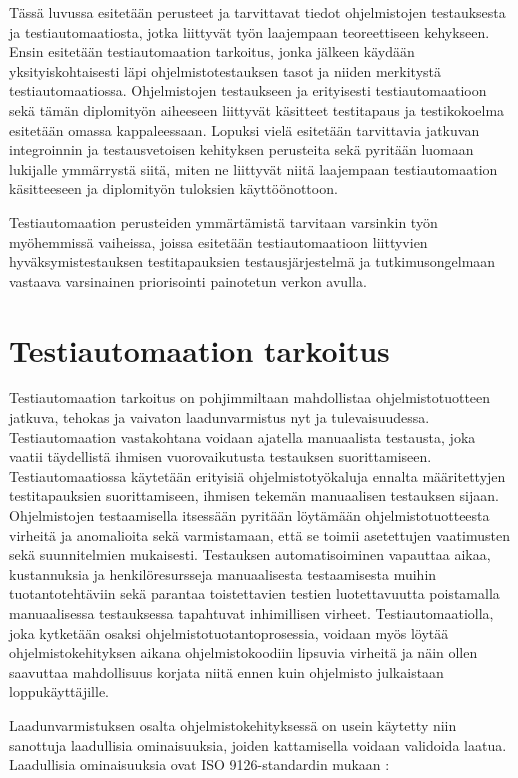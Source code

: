 Tässä luvussa esitetään perusteet ja tarvittavat tiedot ohjelmistojen testauksesta ja testiautomaatiosta, jotka liittyvät työn laajempaan teoreettiseen kehykseen.
Ensin esitetään testiautomaation tarkoitus, jonka jälkeen käydään yksityiskohtaisesti läpi ohjelmistotestauksen tasot ja niiden merkitystä testiautomaatiossa.
Ohjelmistojen testaukseen ja erityisesti testiautomaatioon sekä tämän diplomityön aiheeseen liittyvät käsitteet testitapaus ja testikokoelma esitetään omassa kappaleessaan.
Lopuksi vielä esitetään tarvittavia jatkuvan integroinnin ja testausvetoisen kehityksen perusteita sekä pyritään luomaan lukijalle ymmärrystä siitä, miten ne liittyvät niitä laajempaan testiautomaation käsitteeseen ja diplomityön tuloksien käyttöönottoon.

Testiautomaation perusteiden ymmärtämistä tarvitaan varsinkin työn myöhemmissä vaiheissa, joissa esitetään testiautomaatioon liittyvien hyväksymistestauksen testitapauksien testausjärjestelmä ja tutkimusongelmaan vastaava varsinainen priorisointi painotetun verkon avulla.

\section{Testiautomaation tarkoitus} \label{ch:07_testiautomaation_tarkoitus}

  Testiautomaation tarkoitus on pohjimmiltaan mahdollistaa ohjelmistotuotteen jatkuva, tehokas ja vaivaton laadunvarmistus nyt ja tulevaisuudessa.
  Testiautomaation vastakohtana voidaan ajatella manuaalista testausta, joka vaatii täydellistä ihmisen vuorovaikutusta testauksen suorittamiseen.
  Testiautomaatiossa käytetään erityisiä ohjelmistotyökaluja ennalta määritettyjen testitapauksien suorittamiseen, ihmisen tekemän manuaalisen testauksen sijaan.
  Ohjelmistojen testaamisella itsessään pyritään löytämään ohjelmistotuotteesta virheitä ja anomalioita sekä varmistamaan, että se toimii asetettujen vaatimusten sekä suunnitelmien mukaisesti.
  Testauksen automatisoiminen vapauttaa aikaa, kustannuksia ja henkilöresursseja manuaalisesta testaamisesta muihin tuotantotehtäviin sekä parantaa toistettavien testien luotettavuutta poistamalla manuaalisessa testauksessa tapahtuvat inhimillisen virheet.
  Testiautomaatiolla, joka kytketään osaksi ohjelmistotuotantoprosessia, voidaan myös löytää ohjelmistokehityksen aikana ohjelmistokoodiin lipsuvia virheitä ja näin ollen saavuttaa mahdollisuus korjata niitä ennen kuin ohjelmisto julkaistaan loppukäyttäjille.

  Laadunvarmistuksen osalta ohjelmistokehityksessä on usein käytetty niin sanottuja laadullisia ominaisuuksia, joiden kattamisella voidaan validoida laatua.
  Laadullisia ominaisuuksia ovat ISO 9126-standardin mukaan \parencite{iso_9126-1_2001}:

